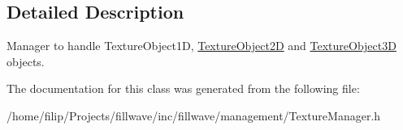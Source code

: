 \subsection{Detailed Description}
Manager to handle Texture\+Object1\+D, \hyperlink{classfillwave_1_1manager_1_1TextureObject2D}{Texture\+Object2\+D} and \hyperlink{classfillwave_1_1manager_1_1TextureObject3D}{Texture\+Object3\+D} objects. 

The documentation for this class was generated from the following file\+:\begin{DoxyCompactItemize}
\item 
/home/filip/\+Projects/fillwave/inc/fillwave/management/Texture\+Manager.\+h\end{DoxyCompactItemize}

